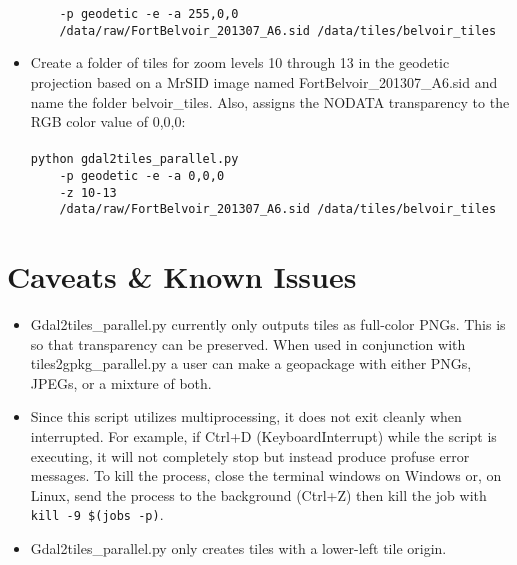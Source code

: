 \documentclass{article}
\begin{document}
\begin{itemize}
        \lstinline|    -p geodetic -e -a 255,0,0|\\
        \lstinline|    /data/raw/FortBelvoir_201307_A6.sid /data/tiles/belvoir_tiles|
    \item
        Create a folder of tiles for zoom levels 10 through 13 in the geodetic
        projection based on a MrSID image named FortBelvoir\_201307\_A6.sid
        and name the folder belvoir\_tiles. Also, assigns the NODATA
        transparency to the RGB color value of 0,0,0:\\
        \\
        \lstinline|python gdal2tiles_parallel.py|\\
        \lstinline|    -p geodetic -e -a 0,0,0|\\
        \lstinline|    -z 10-13|\\
        \lstinline|    /data/raw/FortBelvoir_201307_A6.sid /data/tiles/belvoir_tiles|
\end{itemize}

\section{Caveats \& Known Issues}
\begin{itemize}
    \item
        Gdal2tiles\_parallel.py currently only outputs tiles as full-color
        PNGs.  This is so that transparency can be preserved.  When used in
        conjunction with tiles2gpkg\_parallel.py a user can make a geopackage
        with either PNGs, JPEGs, or a mixture of both.
    \item
        Since this script utilizes multiprocessing, it does not exit cleanly
        when interrupted.  For example, if Ctrl+D (KeyboardInterrupt) while the
        script is executing, it will not completely stop but instead produce
        profuse error messages.  To kill the process, close the terminal
        windows on Windows or, on Linux, send the process to the background
        (Ctrl+Z) then kill the job with \lstinline|kill -9 $(jobs -p)|.
    \item
        Gdal2tiles\_parallel.py only creates tiles with a lower-left tile
        origin.
\end{itemize}
\end{document}
